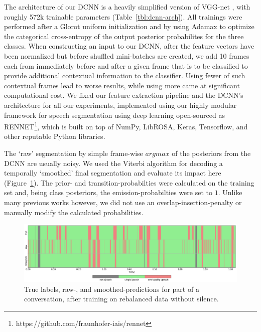 \documentclass[a4paper]{article}
\begin{document}
The architecture of our DCNN is a heavily simplified version of VGG-net \cite{simonyan_very_2014},
with roughly 572k trainable parameters (Table~\ref{tbl:dcnn-arch}).
All trainings were performed after a Glorot uniform initialization and by using Adamax to optimize the categorical cross-entropy of the output posterior probabilites for the three classes.
When constructing an input to our DCNN,
after the feature vectors have been normalized but before shuffled mini-batches are created,
we add 10 frames each from immediately before and after a given frame that is to be classified
to provide additional contextual information to the classifier.
Using fewer of such contextual frames lead to worse results,
while using more came at significant computational cost.
We fixed our feature extraction pipeline and the DCNN's architecture for all our experiments,
implemented using our highly modular framework for
speech segmentation using deep learning open-sourced as
{RENNET}\footnote{https://github.com/fraunhofer-iais/rennet},
which is built on top of NumPy, LibROSA, Keras, Tensorflow, and other reputable Python libraries.

The `raw' segmentation by simple frame-wise $argmax$ of the posteriors from the DCNN are usually noisy.
We used the Viterbi algorithm \cite{rabiner_tutorial_1989} for decoding a temporally `smoothed' final segmentation and evaluate its impact here (Figure~\ref{fig:raw-smth-preds}).
The prior- and transition-probabilties were calculated on the training set and,
being class posteriors, the emission-probabilties were set to $1$.
Unlike many previous works \cite{zelenak_simultaneous_2012,zelenak_speaker_2012,GeigerUsinglinguisticinformation2013,yella_overlapping_2014,geiger_detecting_2013} however,
we did not use an overlap-insertion-penalty or manually modify the calculated probabilities.

\begin{figure}[t]
  \centering
  \includegraphics[width=\linewidth]{figures/raw-smth-preds.png}
  \caption{True labels, raw-, and smoothed-predictions for part of a conversation, after training on rebalanced data without silence.}
  \label{fig:raw-smth-preds}
  \vspace*{-\baselineskip}
\end{figure}
\end{document}
